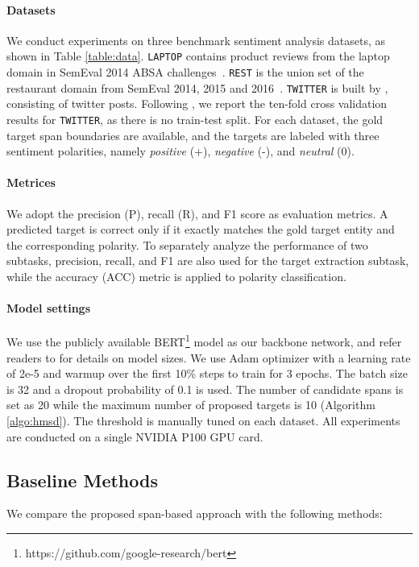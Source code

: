 \documentclass[11pt,a4paper]{article}
\newcommand\bertlarge{BERT\xspace}
\begin{document}
\paragraph{Datasets}
We conduct experiments on three benchmark sentiment analysis datasets, as shown in Table \ref{table:data}.
\texttt{LAPTOP} contains product reviews from the laptop domain in SemEval 2014 ABSA challenges~\cite{pontiki2014semeval}.
\texttt{REST} is the union set of the restaurant domain from SemEval 2014, 2015 and 2016~\cite{pontiki2015semeval,pontiki2016semeval}.
\texttt{TWITTER} is built by \citet{mitchell2013open}, consisting of twitter posts.
Following \citet{zhang2015neural,li2018unified}, we report the ten-fold cross validation results for \texttt{TWITTER}, as there is no train-test split.
For each dataset, the gold target span boundaries are available, and the targets are labeled with three sentiment polarities, namely \emph{positive} (+), \emph{negative} (-), and \emph{neutral} (0).

\paragraph{Metrices}
We adopt the precision (P), recall (R), and F1 score as evaluation metrics. 
A predicted target is correct only if it exactly matches the gold target entity and the corresponding polarity.
To separately analyze the performance of two subtasks, precision, recall, and F1 are also used for the target extraction subtask, while the accuracy (ACC) metric is applied to polarity classification.

\paragraph{Model settings}
We use the publicly available \bertlarge\footnote{https://github.com/google-research/bert} model as our backbone network, and refer readers to \citet{devlin2018bert} for details on model sizes.
We use Adam optimizer with a learning rate of 2e-5 and warmup over the first 10\% steps to train for 3 epochs.
The batch size is 32 and a dropout probability of 0.1 is used.
The number of candidate spans  is set as 20 while the maximum number of proposed targets  is 10 (Algorithm \ref{algo:hmsd}).
The threshold  is manually tuned on each dataset.
All experiments are conducted on a single NVIDIA P100 GPU card.


\subsection{Baseline Methods}
We compare the proposed span-based approach with the following methods:
\end{document}
